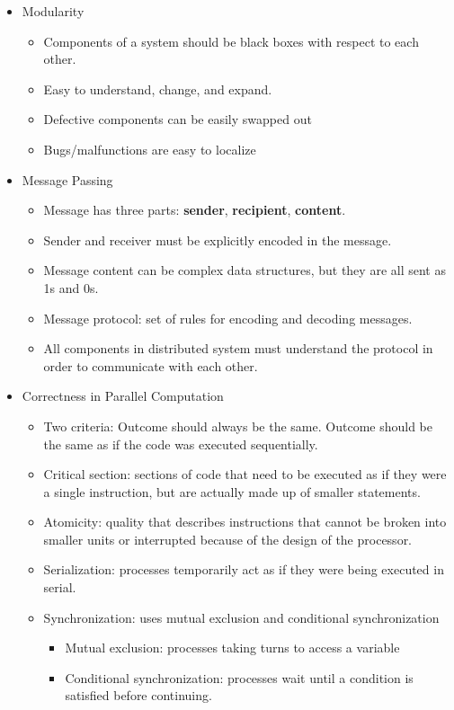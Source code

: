 \documentclass[letterpaper,english,12pt]{article}
\begin{document}
\begin{itemize}
\begin{itemize}
		\end{itemize}
	\item Modularity
		\begin{itemize}
			\item Components of a system should be black boxes with respect to each other.
			\item Easy to understand, change, and expand.
			\item Defective components can be easily swapped out
			\item Bugs/malfunctions are easy to localize
		\end{itemize}
	\item Message Passing
		\begin{itemize}
			\item Message has three parts: \textbf{sender}, \textbf{recipient}, \textbf{content}.
			\item Sender and receiver must be explicitly encoded in the message.
			\item Message content can be complex data structures, but they are all sent as 1s and 0s.
			\item Message protocol: set of rules for encoding and decoding messages.
			\item All components in distributed system must understand the protocol in order to communicate with each other.
		\end{itemize}
	\item Correctness in Parallel Computation
		\begin{itemize}
			\item Two criteria: Outcome should always be the same. Outcome should be the same as if the code was executed sequentially.
			\item Critical section: sections of code that need to be executed as if they were a single instruction, but are actually made up of smaller statements.
			\item Atomicity: quality that describes instructions that cannot be broken into smaller units or interrupted because of the design of the processor. 
			\item Serialization: processes temporarily act as if they were being executed in serial.
			\item Synchronization: uses mutual exclusion and conditional synchronization
				\begin{itemize}
					\item Mutual exclusion: processes taking turns to access a variable
					\item Conditional synchronization: processes wait until a condition is satisfied before continuing.

\end{itemize}
\end{itemize}
\end{itemize}
\end{document}
